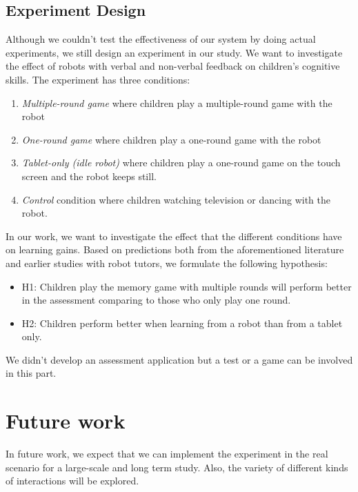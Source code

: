 \documentclass[12pt]{article}
\begin{document}
\subsection{Experiment Design}
Although we couldn't test the effectiveness of our system by doing actual experiments, we still design an experiment in our study. We want to investigate the effect of robots with verbal and non-verbal feedback on children's cognitive skills. The experiment has three conditions:
\begin{enumerate}
\item \textit{Multiple-round game} where children play a multiple-round game with the robot
\item \textit{One-round game} where children play a one-round game with the robot
\item \textit{Tablet-only (idle robot)} where children play a one-round game on the touch screen and the robot keeps still.
\item \textit{Control} condition where children watching television or dancing with the robot.
\end{enumerate}

In our work, we want to investigate the effect that the different conditions have on learning gains. Based on predictions both from the aforementioned literature and earlier studies with robot tutors, we formulate the following hypothesis:
\begin{itemize}
\item H1: Children play the memory game with multiple rounds will perform better in the assessment comparing to those who only play one round.
\item H2: Children perform better when learning from a robot than from a tablet only.
\end{itemize}

We didn't develop an assessment application but a test or a game can be involved in this part.
 
\newpage
\section{Future work}

In future work, we expect that we can implement the experiment in the real scenario for a large-scale and long term study. Also, the variety of different kinds of interactions will
be explored.
 
\newpage


 
\end{document}
